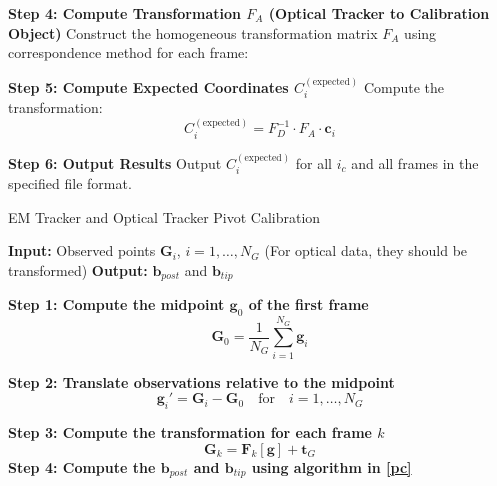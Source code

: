 \documentclass[english,10pt,a4paper]{book}
\begin{document}
\begin{algorithm}[H]
\begin{algorithmic}[1]
    		\State \textbf{Step 4: Compute Transformation \( F_A \) (Optical Tracker to Calibration Object)}
    		\State Construct the homogeneous transformation matrix \( F_A \) using correspondence method for each frame:
    		
    		\State \textbf{Step 5: Compute Expected Coordinates \( C_i^{(\text{expected})} \)}
    		\State Compute the transformation:
    		\[
    		C_i^{(\text{expected})} = F_D^{-1} \cdot F_A \cdot \mathbf{c}_i
    		\]
    		
    		\State \textbf{Step 6: Output Results}
    		\State Output \( C_i^{(\text{expected})} \) for all \( i_c \) and all frames in the specified file format.
    		
    	\end{algorithmic}
    \end{algorithm}
    
    \begin{algorithm}[H]
    	\caption{EM Tracker and Optical Tracker Pivot Calibration}
    	\begin{algorithmic}[1]
    		\State \textbf{Input:} Observed points \( \mathbf{G}_i \), \( i = 1, \dots, N_G \) (For optical data, they should be transformed)
    		\State \textbf{Output:} \( \mathbf{b}_{post} \) and \( \mathbf{b}_{tip} \) 
    		
    		\State \textbf{Step 1: Compute the midpoint \( \mathbf{g}_0 \) of the first frame}
    		\[
    		\mathbf{G}_0 = \frac{1}{N_G} \sum_{i=1}^{N_G} \mathbf{g}_i
    		\]
    		
    		\State \textbf{Step 2: Translate observations relative to the midpoint}
    		\[
    		\mathbf{g}_i' = \mathbf{G}_i - \mathbf{G}_0 \quad \text{for} \quad i = 1, \dots, N_G
    		\]
    		
    		\State \textbf{Step 3: Compute the transformation for each frame \( k \)}
    		\[
    		\mathbf{G}_k = \mathbf{F}_k[\mathbf{g}] + \mathbf{t}_G
    		\]
    		\State \textbf{Step 4: Compute the \( \mathbf{b}_{post} \) and \( \mathbf{b}_{tip} \) using algorithm in \ref{pc}}
    	\end{algorithmic}
    \end{algorithm}
    \vspace{3cm}
\end{document}
